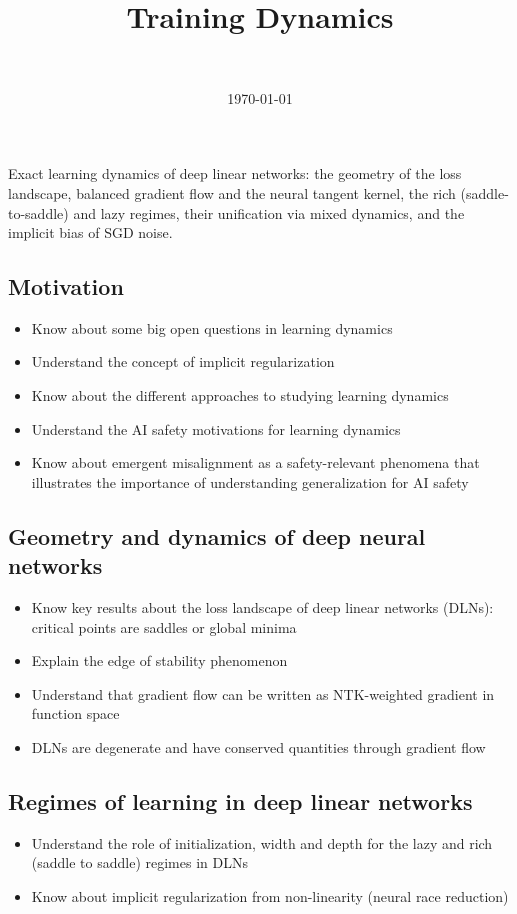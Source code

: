 \documentclass[11pt]{article}
\title{Training Dynamics}
\author{\authorname{Guillaume Corlouer}\\ \affiliation{Stormglass}}
\date{\today}
\begin{document}
\maketitle

\begin{summary}
Exact learning dynamics of deep linear networks: the geometry of the loss
landscape, balanced gradient flow and the neural tangent kernel, the rich
(saddle-to-saddle) and lazy regimes, their unification via mixed dynamics,
and the implicit bias of SGD noise.
\end{summary}

\begin{learningoutcomes}
  \subsection*{Motivation}
  \begin{itemize}
    \item Know about some big open questions in learning dynamics
    \item Understand the concept of implicit regularization
    \item Know about the different approaches to studying learning dynamics
    \item Understand the AI safety motivations for learning dynamics
    \item Know about emergent misalignment as a safety-relevant phenomena that illustrates the importance of understanding generalization for AI safety
  \end{itemize}

  \subsection*{Geometry and dynamics of deep neural networks}
  \begin{itemize}
    \item Know key results about the loss landscape of deep linear networks (DLNs): critical points are saddles or global minima
    \item Explain the edge of stability phenomenon
    \item Understand that gradient flow can be written as NTK-weighted gradient in function space
    \item DLNs are degenerate and have conserved quantities through gradient flow
  \end{itemize}

  \subsection*{Regimes of learning in deep linear networks}
  \begin{itemize}
    \item Understand the role of initialization, width and depth for the lazy and rich (saddle to saddle) regimes in DLNs
    \item Know about implicit regularization from non-linearity (neural race reduction)
  \end{itemize}
\end{learningoutcomes}
\end{document}
